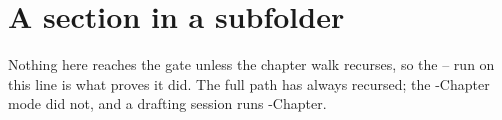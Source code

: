 \section{A section in a subfolder}
\label{sec:ch01-nested}

Nothing here reaches the gate unless the chapter walk recurses, so the -- run on
this line is what proves it did. The full path has always recursed; the
-Chapter mode did not, and a drafting session runs -Chapter.
